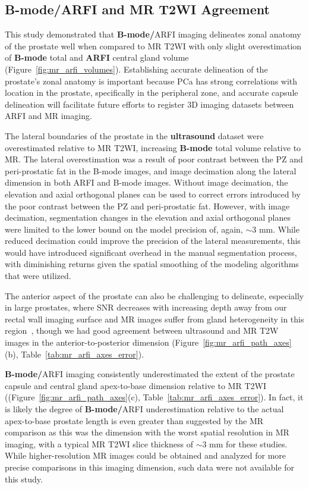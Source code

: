 \subsection{B-mode/ARFI and MR T2WI Agreement}
This study demonstrated that \textbf{B-mode/}ARFI imaging delineates zonal
anatomy of the prostate well when compared to MR T2WI with only slight
overestimation of \textbf{B-mode} total and \textbf{ARFI} central gland volume
(Figure~\ref{fig:mr_arfi_volumes}).  Establishing accurate delineation of the
prostate's zonal anatomy is important because PCa has strong correlations with
location in the prostate, specifically in the peripheral zone, and accurate
capsule delineation will facilitate future efforts to register 3D imaging
datasets between ARFI and MR imaging. 



The lateral boundaries of the prostate in the \textbf{ultrasound} dataset were
overestimated relative to MR T2WI, increasing \textbf{B-mode} total volume
relative to MR. The lateral overestimation was a result of poor contrast
between the PZ and peri-prostatic fat in the B-mode images, and image
decimation along the lateral dimension in both ARFI and B-mode images. Without
image decimation, the elevation and axial orthogonal planes can be used to
correct errors introduced by the poor contrast between the PZ and
peri-prostatic fat. However, with image decimation, segmentation changes in the
elevation and axial orthogonal planes were limited to the lower bound on the
model precision of, again, $\sim$3 mm.  While reduced decimation could improve
the precision of the lateral measurements, this would have introduced
significant overhead in the manual segmentation process, with diminishing
returns given the spatial smoothing of the modeling algorithms that were
utilized. 



The anterior aspect of the prostate can also be challenging to delineate,
especially in large prostates, where SNR decreases with increasing depth away
from our rectal wall imaging surface and MR images suffer from gland
heterogeneity in this region~\cite{Gupta2013}, though we had good agreement
between ultrasound and MR T2W images in the anterior-to-posterior dimension
(Figure~\ref{fig:mr_arfi_path_axes}(b), Table~\ref{tab:mr_arfi_axes_error}).

\textbf{B-mode/}ARFI imaging consistently underestimated the extent of the
prostate capsule and central gland apex-to-base dimension relative to MR T2WI
((Figure~\ref{fig:mr_arfi_path_axes}(c), Table~\ref{tab:mr_arfi_axes_error}).
In fact, it is likely the degree of \textbf{B-mode/}ARFI underestimation
relative to the actual apex-to-base prostate length is even greater than
suggested by the MR comparison as this was the dimension with the worst spatial
resolution in MR imaging, with a typical MR T2WI slice thickness of $\sim$3 mm
for these studies.  While higher-resolution MR images could be obtained and
analyzed for more precise comparisons in this imaging dimension, such data were
not available for this study. 
